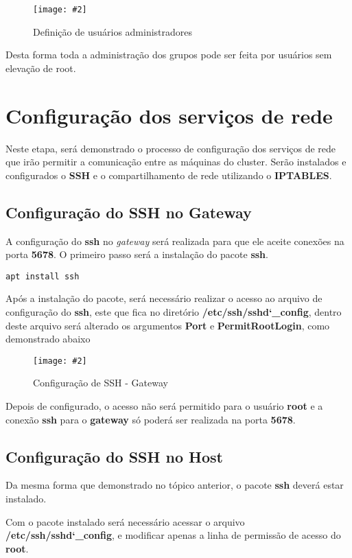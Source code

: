 \documentclass[
	12pt,				%
	openany,			%
	a4paper,			%
	chapter=TITLE,		%
	section=TITLE,		%
	english,
	brazil				%
]{abntex2}
\newcommand{\includeImage}[3] {

\begin{figure}[H]
 	 \centering
  		\texttt{[image: \#2]}
  	\caption{#3}
\end{figure}

}
\begin{document}
\includeImage{0.7}{imgs/5_gerenciamento_grupos/definindo_administrador_dos_grupos.png}{Definição de usuários administradores}

Desta forma toda a administração dos grupos pode ser feita por usuários sem elevação de root.

\section{Configuração dos serviços de rede}

Neste etapa, será demonstrado o processo de configuração dos serviços de rede que irão permitir a comunicação entre as máquinas do cluster. Serão instalados e configurados o \textbf{SSH} e o compartilhamento de rede utilizando o \textbf{IPTABLES}.

\subsection{Configuração do SSH no Gateway}

A configuração do \textbf{ssh} no \textit{gateway} será realizada para que ele aceite conexões na porta \textbf{5678}. O primeiro passo será a instalação do pacote \textbf{ssh}.

\begin{lstlisting}
apt install ssh
\end{lstlisting}

Após a instalação do pacote, será necessário realizar o acesso ao arquivo de configuração do \textbf{ssh}, este que fica no diretório \textbf{/etc/ssh/sshd\char`_config}, dentro deste arquivo será alterado os argumentos \textbf{Port} e \textbf{PermitRootLogin}, como demonstrado abaixo 

\includeImage{0.7}{imgs/4_configuracao_servicos_rede/1_gateway_1.png}{Configuração de SSH - Gateway}

Depois de configurado, o acesso não será permitido para o usuário \textbf{root} e a conexão \textbf{ssh} para o \textbf{gateway} só poderá ser realizada na porta \textbf{5678}.

\subsection{Configuração do SSH no Host}

Da mesma forma que demonstrado no tópico anterior, o pacote \textbf{ssh} deverá estar instalado.

Com o pacote instalado será necessário acessar o arquivo \textbf{/etc/ssh/sshd\char`_config}, e modificar apenas a linha de permissão de acesso do \textbf{root}. 
\end{document}

